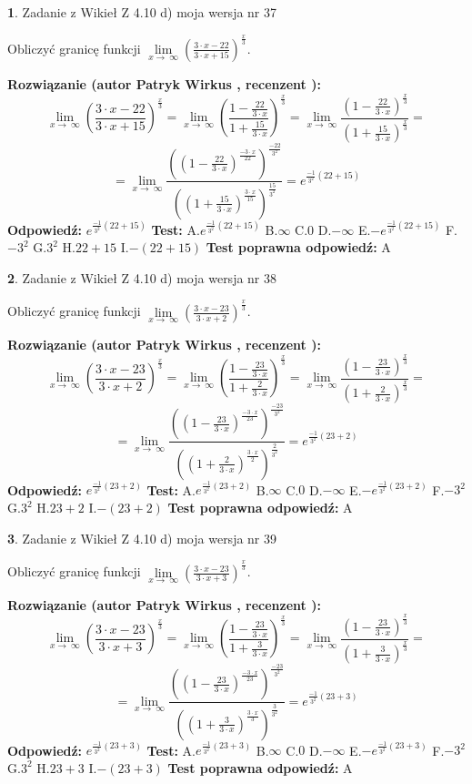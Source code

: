 \documentclass[12pt, a4paper]{article}
\theoremstyle{definition} %
\newtheorem{zad}{}
\newcommand{\zadStart}[1]{\begin{zad}#1\newline}
\newcommand{\zadStop}{\end{zad}}
\newcommand{\rozwStart}[2]{\noindent \textbf{Rozwiązanie (autor #1 , recenzent #2): }\newline}
\newcommand{\rozwStop}{\newline}
\newcommand{\odpStart}{\noindent \textbf{Odpowiedź:}\newline}
\newcommand{\odpStop}{\newline}
\newcommand{\testStart}{\noindent \textbf{Test:}\newline}
\newcommand{\testStop}{\newline}
\newcommand{\kluczStart}{\noindent \textbf{Test poprawna odpowiedź:}\newline}
\newcommand{\kluczStop}{\newline}
\begin{document}
\zadStart{Zadanie z Wikieł Z 4.10 d) moja wersja nr 37}


Obliczyć granicę funkcji  $\lim\limits_{x\to\ \infty}(\frac{3\cdot x-22}{3\cdot x+15})^{\frac{x}{3}}$.
\zadStop
\rozwStart{Patryk Wirkus}{}
$$\lim\limits_{x\to\ \infty}(\frac{3\cdot x-22}{3\cdot x+15})^{\frac{x}{3}} = \lim\limits_{x\to\ \infty}(\frac{1-\frac{22}{3\cdot x}}{1+\frac{15}{3\cdot x}})^{\frac{x}{3}}=\lim\limits_{x\to\ \infty}\frac{(1-\frac{22}{3\cdot x})^{\frac{x}{3}}}{(1+\frac{15}{3\cdot x})^{\frac{x}{3}}}=$$
$$=\lim\limits_{x\to\ \infty}\frac{((1-\frac{22}{3\cdot x})^{\frac{-3\cdot x}{22}})^{\frac{-22}{3^{2}}}}{((1+\frac{15}{3\cdot x})^{\frac{3\cdot x}{15}})^{\frac{15}{3^{2}}}}=e^{\frac{-1}{3^{2}}(22+15)}$$
\rozwStop
\odpStart
$e^{\frac{-1}{3^{2}}(22+15)}$
\odpStop
\testStart
A.$e^{\frac{-1}{3^{2}}(22+15)}$ B.$\infty$ C.$0$ D.$-\infty$ E.$-e^{\frac{-1}{3^{2}}(22+15)}$
F.$-3^{2}$ G.$3^{2}$
H.$22+15$
I.$-(22+15)$
\testStop
\kluczStart
A
\kluczStop



\zadStart{Zadanie z Wikieł Z 4.10 d) moja wersja nr 38}


Obliczyć granicę funkcji  $\lim\limits_{x\to\ \infty}(\frac{3\cdot x-23}{3\cdot x+2})^{\frac{x}{3}}$.
\zadStop
\rozwStart{Patryk Wirkus}{}
$$\lim\limits_{x\to\ \infty}(\frac{3\cdot x-23}{3\cdot x+2})^{\frac{x}{3}} = \lim\limits_{x\to\ \infty}(\frac{1-\frac{23}{3\cdot x}}{1+\frac{2}{3\cdot x}})^{\frac{x}{3}}=\lim\limits_{x\to\ \infty}\frac{(1-\frac{23}{3\cdot x})^{\frac{x}{3}}}{(1+\frac{2}{3\cdot x})^{\frac{x}{3}}}=$$
$$=\lim\limits_{x\to\ \infty}\frac{((1-\frac{23}{3\cdot x})^{\frac{-3\cdot x}{23}})^{\frac{-23}{3^{2}}}}{((1+\frac{2}{3\cdot x})^{\frac{3\cdot x}{2}})^{\frac{2}{3^{2}}}}=e^{\frac{-1}{3^{2}}(23+2)}$$
\rozwStop
\odpStart
$e^{\frac{-1}{3^{2}}(23+2)}$
\odpStop
\testStart
A.$e^{\frac{-1}{3^{2}}(23+2)}$ B.$\infty$ C.$0$ D.$-\infty$ E.$-e^{\frac{-1}{3^{2}}(23+2)}$
F.$-3^{2}$ G.$3^{2}$
H.$23+2$
I.$-(23+2)$
\testStop
\kluczStart
A
\kluczStop



\zadStart{Zadanie z Wikieł Z 4.10 d) moja wersja nr 39}


Obliczyć granicę funkcji  $\lim\limits_{x\to\ \infty}(\frac{3\cdot x-23}{3\cdot x+3})^{\frac{x}{3}}$.
\zadStop
\rozwStart{Patryk Wirkus}{}
$$\lim\limits_{x\to\ \infty}(\frac{3\cdot x-23}{3\cdot x+3})^{\frac{x}{3}} = \lim\limits_{x\to\ \infty}(\frac{1-\frac{23}{3\cdot x}}{1+\frac{3}{3\cdot x}})^{\frac{x}{3}}=\lim\limits_{x\to\ \infty}\frac{(1-\frac{23}{3\cdot x})^{\frac{x}{3}}}{(1+\frac{3}{3\cdot x})^{\frac{x}{3}}}=$$
$$=\lim\limits_{x\to\ \infty}\frac{((1-\frac{23}{3\cdot x})^{\frac{-3\cdot x}{23}})^{\frac{-23}{3^{2}}}}{((1+\frac{3}{3\cdot x})^{\frac{3\cdot x}{3}})^{\frac{3}{3^{2}}}}=e^{\frac{-1}{3^{2}}(23+3)}$$
\rozwStop
\odpStart
$e^{\frac{-1}{3^{2}}(23+3)}$
\odpStop
\testStart
A.$e^{\frac{-1}{3^{2}}(23+3)}$ B.$\infty$ C.$0$ D.$-\infty$ E.$-e^{\frac{-1}{3^{2}}(23+3)}$
F.$-3^{2}$ G.$3^{2}$
H.$23+3$
I.$-(23+3)$
\testStop
\kluczStart
A
\kluczStop
\end{document}

